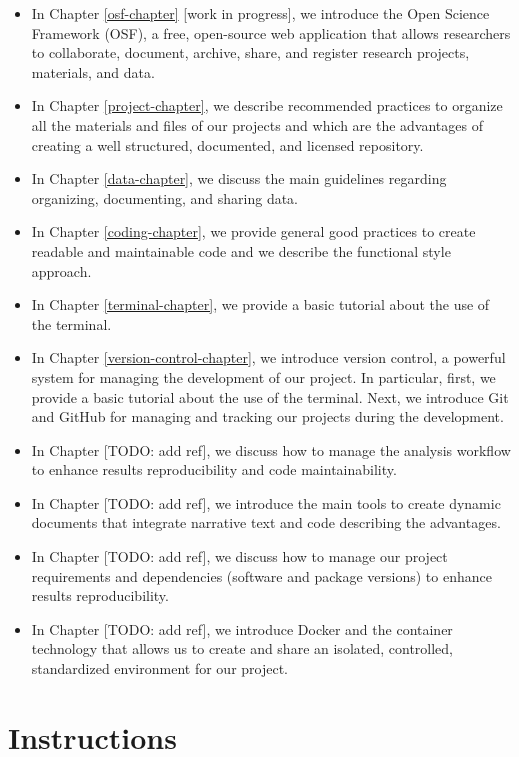 \documentclass[
  11pt,
]{book}
\providecommand{\tightlist}{%
  \setlength{\itemsep}{0pt}\setlength{\parskip}{0pt}}
\begin{document}
\begin{itemize}
\tightlist
\item
  In Chapter \ref{osf-chapter} {[}work in progress{]}, we introduce the Open Science Framework (OSF), a free, open-source web application that allows researchers to collaborate, document, archive, share, and register research projects, materials, and data.
\item
  In Chapter \ref{project-chapter}, we describe recommended practices to organize all the materials and files of our projects and which are the advantages of creating a well structured, documented, and licensed repository.
\item
  In Chapter \ref{data-chapter}, we discuss the main guidelines regarding organizing, documenting, and sharing data.
\item
  In Chapter \ref{coding-chapter}, we provide general good practices to create readable and maintainable code and we describe the functional style approach.
\item
  In Chapter \ref{terminal-chapter}, we provide a basic tutorial about the use of the terminal.
\item
  In Chapter \ref{version-control-chapter}, we introduce version control, a powerful system for managing the development of our project. In particular, first, we provide a basic tutorial about the use of the terminal. Next, we introduce Git and GitHub for managing and tracking our projects during the development.
\item
  In Chapter {[}TODO: add ref{]}, we discuss how to manage the analysis workflow to enhance results reproducibility and code maintainability.
\item
  In Chapter {[}TODO: add ref{]}, we introduce the main tools to create dynamic documents that integrate narrative text and code describing the advantages.
\item
  In Chapter {[}TODO: add ref{]}, we discuss how to manage our project requirements and dependencies (software and package versions) to enhance results reproducibility.
\item
  In Chapter {[}TODO: add ref{]}, we introduce Docker and the container technology that allows us to create and share an isolated, controlled, standardized environment for our project.
\end{itemize}

\hypertarget{instructions}{%
\section{Instructions}\label{instructions}}
\end{document}
